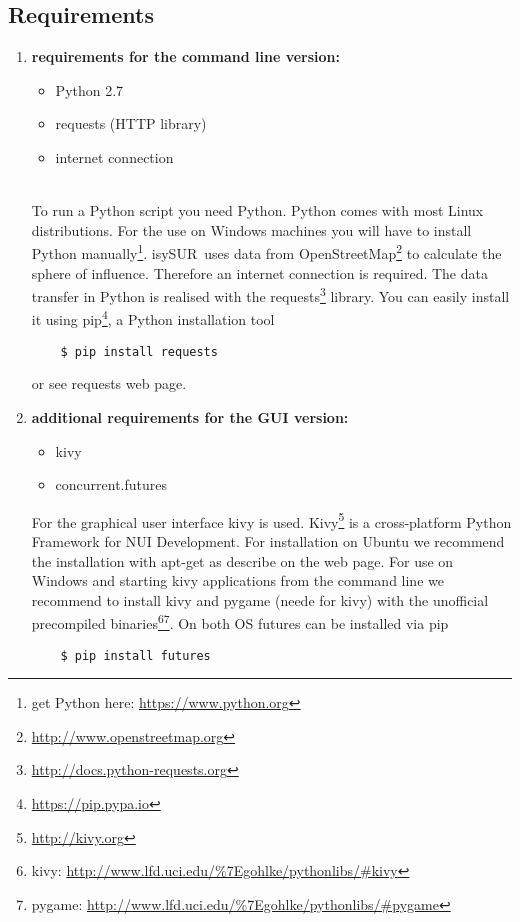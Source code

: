 \documentclass[11pt,fleqn]{book} %
\newcommand{\todol}{\todo[inline]} %
\newcommand{\ProjectTitle}{isySUR}
\newcommand{\pt}{\ProjectTitle}
\begin{document}
\subsection{Requirements}\label{sec:requirements}
\todol{add credits}
\begin{enumerate}
	\item \textbf{requirements for the command line version:}
	\begin{itemize}
		\item Python 2.7
		\item requests (HTTP library)
		\item internet connection
	\end{itemize}
	~\\
	To run a Python script you need Python. Python comes with most Linux distributions. For the use on Windows machines you will have to install Python manually\footnote{get Python here: \url{https://www.python.org}}. \pt\ uses data from OpenStreetMap\footnote{\url{http://www.openstreetmap.org}} to calculate the sphere of influence. Therefore an internet connection is required. The data transfer in Python is realised with the requests\footnote{\url{http://docs.python-requests.org}\label{fn:requests}} library. You can easily install it using pip\footnote{\url{https://pip.pypa.io}}, a Python installation tool
	\begin{verbatim}
	$ pip install requests
	\end{verbatim}
	or see requests web page.
	\item \textbf{additional requirements for the GUI version:}
	\begin{itemize}
		\item kivy
		\item concurrent.futures
	\end{itemize}
	For the graphical user interface kivy is used. Kivy\footnote{\url{http://kivy.org}} is a cross-platform Python Framework for NUI Development. For installation on Ubuntu we recommend the installation with apt-get as describe on the web page. For use on Windows and starting kivy applications from the command line we recommend to install kivy and pygame (neede for kivy) with the unofficial precompiled binaries\footnote{kivy: \url{http://www.lfd.uci.edu/\%7Egohlke/pythonlibs/\#kivy}}\footnote{pygame: \url{http://www.lfd.uci.edu/\%7Egohlke/pythonlibs/\#pygame}}. On both OS futures can be installed via pip
	\begin{verbatim}
	$ pip install futures
	\end{verbatim}
\end{enumerate}
\end{document}
